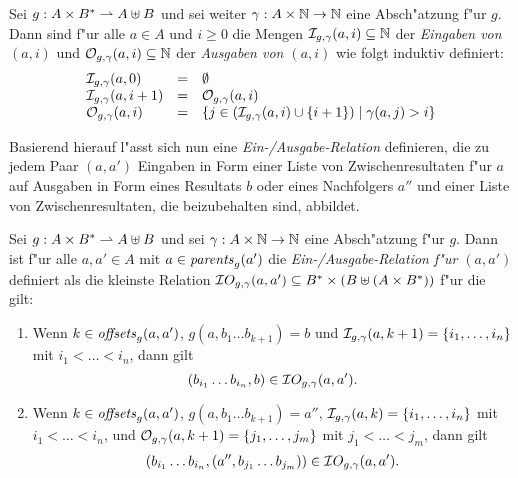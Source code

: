 \documentclass[12pt,a4paper]{article}
\begin{document}
\begin{definition}
  Sei $g: A \times B^* \rightharpoonup A \uplus B$ und sei weiter $\gamma: A \times \mathbb N \to \mathbb N$ eine Absch"atzung
  f"ur $g$. Dann sind f"ur alle $a \in A$ und $i \ge 0$ die Mengen $\mathcal I_{g,\gamma}(a,i) \subseteq \mathbb N$ der
  \emph{Eingaben von $(a,i)$} und $\mathcal O_{g,\gamma}(a,i) \subseteq \mathbb N$ der \emph{Ausgaben von $(a,i)$} wie folgt
  induktiv definiert:
  \[\begin{array}{lcl}
    \mathcal I_{g,\gamma}(a,0)
    &=& \emptyset \\
    \mathcal I_{g,\gamma}(a,i+1)
    &=& \mathcal O_{g,\gamma}(a,i) \\
    \mathcal O_{g,\gamma}(a,i)
    &=& \{j\in(\mathcal I_{g,\gamma}(a,i)\cup\{i+1\}) \mid \gamma(a,j) > i \} \\
  \end{array}\]
\end{definition}

Basierend hierauf l"asst sich nun eine \emph{Ein-/Ausgabe-Relation} definieren, die zu jedem Paar $(a,a')$
Eingaben in Form einer Liste von Zwischenresultaten f"ur $a$ auf Ausgaben in Form eines Resultats $b$ oder
eines Nachfolgers $a''$ und einer Liste von Zwischenresultaten, die beizubehalten sind, abbildet.

\begin{definition}
  Sei $g: A \times B^* \rightharpoonup A \uplus B$ und sei $\gamma: A \times \mathbb N \to \mathbb N$ eine Absch"atzung f"ur $g$.
  Dann ist f"ur alle $a,a' \in A$ mit $a \in \mathit{parents}_g(a')$ die \emph{Ein-/Ausgabe-Relation f"ur $(a,a')$}
  definiert als die kleinste Relation $\mathcal IO_{g,\gamma}(a,a') \subseteq B^* \times (B \uplus (A \times B^*))$
  f"ur die gilt:
  \begin{enumerate}
  \item Wenn $k \in \mathit{offsets}_g(a,a')$, $g(a,b_1 \ldots b_{k+1}) = b$ und $\mathcal I_{g,\gamma}(a,k+1) = \{i_1,\ldots,i_n\}$ mit
    $i_1 < \ldots < i_n$, dann gilt
    \[(b_{i_1} \ldots b_{i_n},b) \in \mathcal IO_{g,\gamma}(a,a').\]
  \item Wenn $k \in \mathit{offsets}_g(a,a')$, $g(a,b_1 \ldots b_{k+1}) = a''$, $\mathcal I_{g,\gamma}(a,k) = \{i_1,\ldots,i_n\}$ mit
    $i_1 < \ldots < i_n$, und $\mathcal O_{g,\gamma}(a,k+1) = \{j_1,\ldots,j_m\}$ mit
    $j_1 < \ldots < j_m$, dann gilt
    \[(b_{i_1} \ldots b_{i_n},(a'',b_{j_1} \ldots b_{j_m})) \in \mathcal IO_{g,\gamma}(a,a').\]
  \end{enumerate}
\end{definition}
\end{document}
